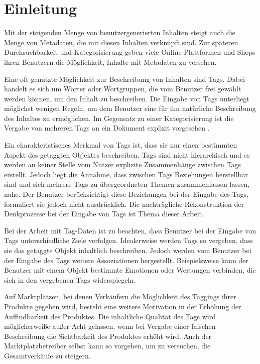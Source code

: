 \chapter{Einleitung}

Mit der steigenden Menge von benutzergenerierten Inhalten steigt auch die Menge von Metadaten, die mit diesen Inhalten verknüpft sind. Zur späteren Durchsuchbarkeit und Kategorisierung geben viele Online-Plattformen und Shops ihren Benutzern die Möglichkeit, Inhalte mit Metadaten zu versehen.

Eine oft genutzte Möglichkeit zur Beschreibung von Inhalten sind Tags. Dabei handelt es sich um Wörter oder Wortgruppen, die vom Benutzer frei gewählt werden können, um den Inhalt zu beschreiben. Die Eingabe von Tags unterliegt möglichst wenigen Regeln, um dem Benutzer eine für ihn natürliche Beschreibung des Inhaltes zu ermöglichen. Im Gegensatz zu einer Kategorisierung ist die Vergabe von mehreren Tags an ein Dokument explizit vorgesehen \cite{sc2005}.

Ein charakteristisches Merkmal von Tags ist, dass sie nur einen bestimmten Aspekt des getaggten Objektes beschreiben. Tags sind nicht hierarchisch und es werden an keiner Stelle vom Nutzer explizite Zusammenhänge zwischen Tags erstellt. Jedoch liegt die Annahme, dass zwischen Tags Beziehungen herstellbar sind und sich mehrere Tags zu übergeordneten Themen zusammenfassen lassen, nahe. Der Benutzer berücksichtigt diese Beziehungen bei der Eingabe des Tags, formuliert sie jedoch nicht ausdrücklich. Die nachträgliche Rekonstruktion der Denkprozesse bei der Eingabe von Tags ist Thema dieser Arbeit.

Bei der Arbeit mit Tag-Daten ist zu beachten, dass Benutzer bei der Eingabe von Tags unterschiedliche Ziele verfolgen. Idealerweise werden Tags so vergeben, dass sie das getaggte Objekt inhaltlich beschreiben. Jedoch werden vom Benutzer bei der Eingabe des Tags weitere Assoziationen hergestellt. Beispielsweise kann der Benutzer mit einem Objekt bestimmte Emotionen oder Wertungen verbinden, die sich in den vergebenen Tags widerspiegeln.

Auf Marktplätzen, bei denen Verkäufern die Möglichkeit des Taggings ihrer Produkte gegeben wird, besteht eine weitere Motivation in der Erhöhung der Auffindbarkeit des Produktes. Die inhaltliche Qualität des Tags wird möglicherweiße außer Acht gelassen, wenn bei Vergabe einer falschen Beschreibung die Sichtbarkeit des Produktes erhöht wird. Auch der Marktplatzbetreiber selbst kann so vorgehen, um zu versuchen, die Gesamtverkäufe zu steigern.

